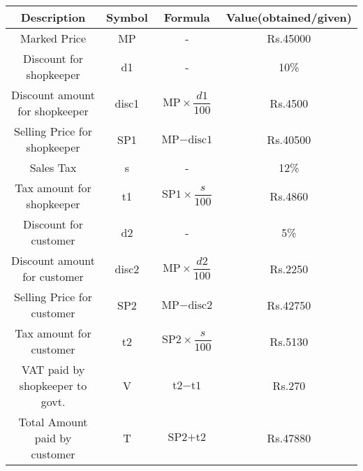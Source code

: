 \begin{center}
    \begin{tabular}{|c|c|c|c|}
       \hline
       \textbf{Description}  & \textbf{Symbol} &  \textbf{Formula}  &  \textbf{Value(obtained/given)} \\
       \hline
       \hline
       Marked Price & MP & - & Rs.45000 \\  
       \hline
       Discount for shopkeeper & d1 & - & 10\% \\
       \hline
       Discount amount for shopkeeper & disc1 & $\text{MP}\times\dfrac{d1}{100}$ & Rs.4500\\
       \hline
       Selling Price for shopkeeper & SP1 & $\text{MP} -  \text{disc1}$ & Rs.40500 \\
       \hline
       Sales Tax & s & - & 12\% \\
       \hline
       Tax amount for shopkeeper & t1 & $\text{SP1}\times\dfrac{s}{100}$ & Rs.4860\\
       \hline
       Discount for customer & d2 & - & 5\% \\
       \hline
       Discount amount for customer & disc2 & $\text{MP}\times\dfrac{d2}{100}$ & Rs.2250 \\
       \hline
       Selling Price for customer & SP2 & $\text{MP} - \text{disc2}$ & Rs.42750 \\
       \hline
       Tax amount for customer & t2 & $\text{SP2}\times\dfrac{s}{100}$ & Rs.5130\\
       \hline
       VAT paid by shopkeeper to govt. & V & $\text{t2} - \text{t1}$ & Rs.270\\
       \hline
       Total Amount paid by customer & T & $\text{SP2} + \text{t2}$ & Rs.47880\\
       \hline
       
    \end{tabular}
\end{center}